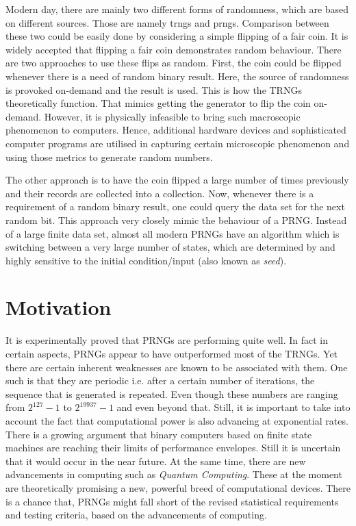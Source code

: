 Modern day, there are mainly two different forms of randomness, which are based on different sources. Those are namely \acrfull{trng}s and \acrfull{prng}s. Comparison between these two could be easily done by considering a simple flipping of a fair coin. It is widely accepted that flipping a fair coin demonstrates random behaviour. There are two approaches to use these flips as random. First, the coin could be flipped whenever there is a need of random binary result. Here, the source of randomness is provoked on-demand and the result is used. This is how the TRNGs theoretically function. That mimics getting the generator to flip the coin on-demand. However, it is physically infeasible to bring such macroscopic phenomenon to computers. Hence, additional hardware devices and sophisticated computer programs are utilised in capturing certain microscopic phenomenon and using those metrics to generate random numbers.

The other approach is to have the coin flipped a large number of times previously and their records are collected into a collection. Now, whenever there is a requirement of a random binary result, one could query the data set for the next random bit. This approach very closely mimic the behaviour of a PRNG. Instead of a large finite data set, almost all modern PRNGs have an algorithm which is switching between a very large number of states, which are determined by and highly sensitive to the initial condition/input (also known as \textit{seed}). 
\section{Motivation}

It is experimentally proved that PRNGs are performing quite well. In fact in certain aspects, PRNGs appear to have outperformed most of the TRNGs. Yet there are certain inherent weaknesses are known to be associated with them. One such is that they are periodic i.e. after a certain number of iterations, the sequence that is generated is repeated. Even though these numbers are ranging from $2^{127}-1$ to $2^{19937}-1$ and even beyond that. Still, it is important to take into account the fact that computational power is also advancing at exponential rates. There is a growing argument that binary computers based on finite state machines are reaching their limits of performance envelopes. Still it is uncertain that it would occur in the near future. At the same time, there are new advancements in computing such as \textit{Quantum Computing}. These at the moment are theoretically promising a new, powerful breed of computational devices. There is a chance that, PRNGs might fall short of the revised statistical requirements and testing criteria, based on the advancements of computing.

